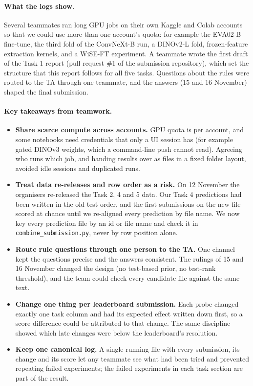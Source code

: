 \paragraph{What the logs show.} Several teammates ran long GPU jobs on their own Kaggle and Colab accounts so that we could use more than one account's quota: for example the EVA02-B fine-tune, the third fold of the ConvNeXt-B run, a DINOv2-L fold, frozen-feature extraction kernels, and a WiSE-FT experiment. A teammate wrote the first draft of the Task 1 report (pull request \#1 of the submission repository), which set the structure that this report follows for all five tasks. Questions about the rules were routed to the TA through one teammate, and the answers (15 and 16 November) shaped the final submission.

\paragraph{Key takeaways from teamwork.}
\begin{itemize}[leftmargin=*,itemsep=2pt]
\item \textbf{Share scarce compute across accounts.} GPU quota is per account, and some notebooks need credentials that only a UI session has (for example gated DINOv3 weights, which a command-line push cannot read). Agreeing who runs which job, and handing results over as files in a fixed folder layout, avoided idle sessions and duplicated runs.
\item \textbf{Treat data re-releases and row order as a risk.} On 12 November the organisers re-released the Task 2, 4 and 5 data. Our Task 4 predictions had been written in the old test order, and the first submissions on the new file scored at chance until we re-aligned every prediction by file name. We now key every prediction file by an id or file name and check it in \texttt{combine\_submission.py}, never by row position alone.
\item \textbf{Route rule questions through one person to the TA.} One channel kept the questions precise and the answers consistent. The rulings of 15 and 16 November changed the design (no test-based prior, no test-rank threshold), and the team could check every candidate file against the same text.
\item \textbf{Change one thing per leaderboard submission.} Each probe changed exactly one task column and had its expected effect written down first, so a score difference could be attributed to that change. The same discipline showed which late changes were below the leaderboard's resolution.
\item \textbf{Keep one canonical log.} A single running file with every submission, its change and its score let any teammate see what had been tried and prevented repeating failed experiments; the failed experiments in each task section are part of the result.
\end{itemize}

